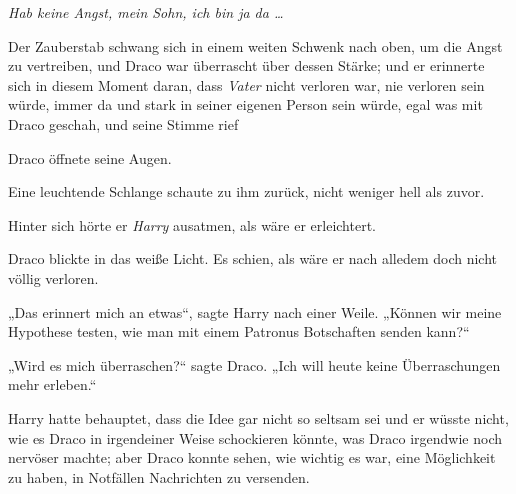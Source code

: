 \emph{Hab keine Angst, mein Sohn, ich bin ja da …}

Der Zauberstab schwang sich in einem weiten Schwenk nach oben, um die Angst zu vertreiben, und Draco war überrascht über dessen Stärke; und er erinnerte sich in diesem Moment daran, dass \emph{Vater} nicht verloren war, nie verloren sein würde, immer da und stark in seiner eigenen Person sein würde, egal was mit Draco geschah, und seine Stimme rief 

Draco öffnete seine Augen.

Eine leuchtende Schlange schaute zu ihm zurück, nicht weniger hell als zuvor.

Hinter sich hörte er \emph{Harry} ausatmen, als wäre er erleichtert.

Draco blickte in das weiße Licht. Es schien, als wäre er nach alledem doch nicht völlig verloren.

„Das erinnert mich an etwas“, sagte Harry nach einer Weile.
„Können wir meine Hypothese testen, wie man mit einem Patronus Botschaften senden kann?“

„Wird es mich überraschen?“ sagte Draco.
„Ich will heute keine Überraschungen mehr erleben.“

\later

Harry hatte behauptet, dass die Idee gar nicht so seltsam sei und er wüsste nicht, wie es Draco in irgendeiner Weise schockieren könnte, was Draco irgendwie noch nervöser machte; aber Draco konnte sehen, wie wichtig es war, eine Möglichkeit zu haben, in Notfällen Nachrichten zu versenden.

